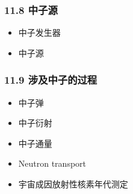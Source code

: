 \subsubsection{11.8 中子源}
\begin{itemize}
\item 中子发生器
\item 中子源
\end{itemize}

\subsubsection{11.9 涉及中子的过程}
\begin{itemize}
\item 中子弹
\item 中子衍射
\item 中子通量
\item Neutron transport
\item 宇宙成因放射性核素年代测定
\end{itemize}

